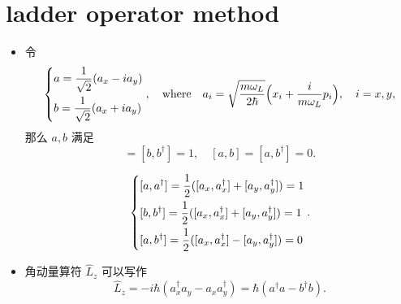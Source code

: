 \section{ladder operator method}
\begin{itemize}
	\item 令
	\begin{equation}
		\begin{dcases}
			a = \frac{1}{\sqrt{2}} (a_x - i a_y) \\
			b = \frac{1}{\sqrt{2}} (a_x + i a_y)
		\end{dcases}, \quad \text{where} \quad a_i = \sqrt{\frac{m \omega_L}{2 \hbar}} \Big( x_i + \frac{i}{m \omega_L} p_i \Big), \quad i = x, y,
	\end{equation}
	那么 $a, b$ 满足
	\begin{equation}
		[a, a^\dag] = [b, b^\dag] = 1, \quad [a, b] = [a, b^\dag] = 0.
	\end{equation}
	
	\begin{tcolorbox}[title=calculation:]
		\begin{equation}
			\begin{dcases}
				[a, a^\dag] = \frac{1}{2} ([a_x, a^\dag_x] + [a_y, a^\dag_y]) = 1 \\
				[b, b^\dag] = \frac{1}{2} ([a_x, a^\dag_x] + [a_y, a^\dag_y]) = 1 \\
				[a, b^\dag] = \frac{1}{2} ([a_x, a^\dag_x] - [a_y, a^\dag_y]) = 0
			\end{dcases}.
		\end{equation}
	\end{tcolorbox}
	
	\item 角动量算符 $\hat{L}_z$ 可以写作
	\begin{equation}
		\hat{L}_z = - i \hbar (a^\dag_x a_y - a_x a^\dag_y) = \hbar (a^\dag a - b^\dag b).
	\end{equation}
	

\end{itemize}
